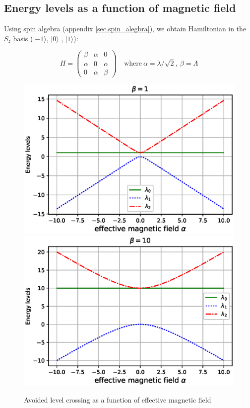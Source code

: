 \documentclass[11pt,a4paper]{article}
\begin{document}
\subsection{Energy levels as a function of magnetic field}

Using spin algebra  (appendix \ref{sec.spin_alegbra}), we obtain Hamiltonian in the $S_z$ basis ($|- 1\rangle$, $| 0 \rangle$ , $| 1 \rangle$):

\begin{equation}
H= \begin{pmatrix}
    \beta       & \alpha  & 0  \\
    \alpha       & 0 &\alpha  \\
     0       & \alpha & \beta
\end{pmatrix}
\quad \mbox{where}  ~
 \alpha= \lambda/ \sqrt{2}, ~ \beta=  \Lambda
\end{equation}


\begin{figure}[!ht]
\begin{center}
\includegraphics[scale=0.5]{pics/energy_level_beta1.eps} 
\includegraphics[scale=0.5]{pics/energy_level_beta10.eps} 
\caption{Avoided level crossing as a function of effective magnetic field }
\label{ev}
\end{center}
\end{figure}
\end{document}
